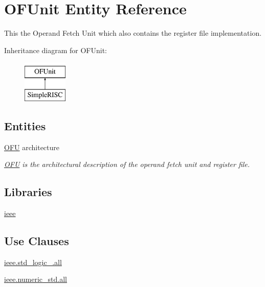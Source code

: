 \hypertarget{class_o_f_unit}{\section{O\-F\-Unit Entity Reference}
\label{class_o_f_unit}
}


This the Operand Fetch Unit which also contains the register file implementation.  


Inheritance diagram for O\-F\-Unit\-:\begin{figure}[H]
\begin{center}
\leavevmode
\includegraphics[height=2.000000cm]{class_o_f_unit}
\end{center}
\end{figure}
\subsection*{Entities}
\begin{DoxyCompactItemize}
\item 
\hyperlink{class_o_f_unit_1_1_o_f_u}{O\-F\-U} architecture
\begin{DoxyCompactList}\small\item\em \hyperlink{class_o_f_unit_1_1_o_f_u}{O\-F\-U} is the architectural description of the operand fetch unit and register file. \end{DoxyCompactList}\end{DoxyCompactItemize}
\subsection*{Libraries}
 \begin{DoxyCompactItemize}
\item 
\hypertarget{class_o_f_unit_a0a6af6eef40212dbaf130d57ce711256}{\hyperlink{class_o_f_unit_a0a6af6eef40212dbaf130d57ce711256}{ieee} }\label{class_o_f_unit_a0a6af6eef40212dbaf130d57ce711256}

\end{DoxyCompactItemize}
\subsection*{Use Clauses}
 \begin{DoxyCompactItemize}
\item 
\hypertarget{class_o_f_unit_a43ecb358105806229eb7a3074fc4d577}{\hyperlink{class_o_f_unit_a43ecb358105806229eb7a3074fc4d577}{ieee.\-std\-\_\-logic\-\_.\-all}   }\label{class_o_f_unit_a43ecb358105806229eb7a3074fc4d577}

\item 
\hypertarget{class_o_f_unit_a631689596594b2068e0ee8dadd0931fe}{\hyperlink{class_o_f_unit_a631689596594b2068e0ee8dadd0931fe}{ieee.\-numeric\-\_\-std.\-all}   }\label{class_o_f_unit_a631689596594b2068e0ee8dadd0931fe}

\end{DoxyCompactItemize}
